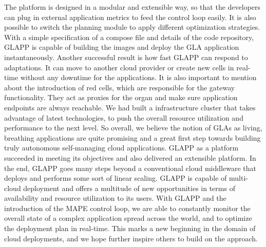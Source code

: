 \documentclass{seal_thesis}
\begin{document}
The platform is designed in a modular and extensible way, so that the developers can plug in external application metrics to feed the control loop easily.
It is also possible to switch the planning module to apply different optimization strategies.
With a simple specification of a compose file and details of the code repository, GLAPP is capable of building the images and deploy the GLA application instantaneously.
Another successful result is how fast GLAPP can respond to adaptations.
It can move to another cloud provider or create new cells in real-time without any downtime for the applications.
It is also important to mention about the introduction of red cells, which are responsible for the gateway functionality.
They act as proxies for the organ and make sure application endpoints are always reachable.
We had built a infrastructure cluster that takes advantage of latest technologies, to push the overall resource utilization and performance to the next level.
So overall, we believe the notion of GLAs as living, breathing applications are quite promising and a great first step towards building truly autonomous self-managing cloud applications. 
GLAPP as a platform succeeded in meeting its objectives and also delivered an extensible platform.
In the end, GLAPP goes many steps beyond a conventional cloud middleware that deploys and performs some sort of linear scaling.
GLAPP is capable of multi-cloud deployment and offers a multitude of new opportunities in terms of availability and resource utilization to its users.
With GLAPP and the introduction of the MAPE control loop, we are able to constantly monitor the overall state of a complex application spread across the world, and to optimize the deployment plan in real-time. 
This marks a new beginning in the domain of cloud deployments, and we hope further inspire others to build on the approach.




\end{document}
